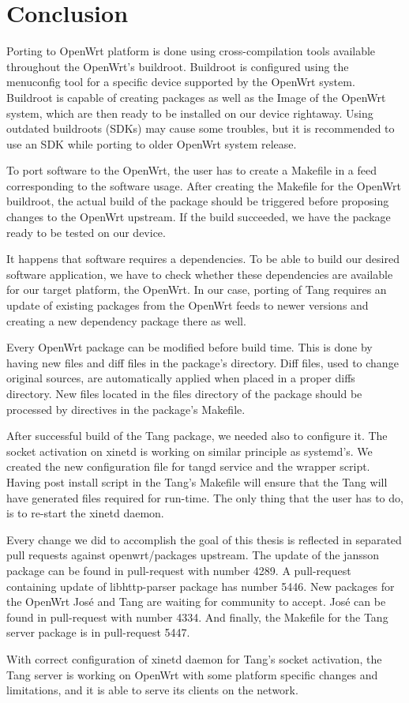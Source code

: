 \chapter{Conclusion}\label{conlusion}


Porting to OpenWrt platform is done using cross-compilation tools available throughout the OpenWrt's buildroot.
Buildroot is configured using the menuconfig tool for a specific device supported by the OpenWrt system.
Buildroot is capable of creating packages as well as the Image of the OpenWrt system, which are then ready to be installed on our device rightaway.
Using outdated buildroots (SDKs) may cause some troubles, but it is recommended to use an SDK while porting to older OpenWrt system release.

To port software to the OpenWrt, the user has to create a Makefile in a feed corresponding to the software usage.
After creating the Makefile for the OpenWrt buildroot, the actual build of the package should be triggered before proposing changes to the OpenWrt upstream.
If the build succeeded, we have the package ready to be tested on our device.

It happens that software requires a dependencies.
To be able to build our desired software application, we have to check whether these dependencies are available for our target platform, the OpenWrt.
In our case, porting of Tang requires an update of existing packages from the OpenWrt feeds to newer versions and creating a new dependency package there as well.

Every OpenWrt package can be modified before build time.
This is done by having new files and diff files in the package's directory.
Diff files, used to change original sources, are automatically applied when placed in a proper diffs directory.
New files located in the files directory of the package should be processed by directives in the package's Makefile.

After successful build of the Tang package, we needed also to configure it.
The socket activation on xinetd is working on similar principle as systemd's.
We created the new configuration file for tangd service and the wrapper script.
Having post install script in the Tang's Makefile will ensure that the Tang will have generated files required for run-time.
The only thing that the user has to do, is to re-start the xinetd daemon.

Every change we did to accomplish the goal of this thesis is reflected in separated pull requests against openwrt/packages upstream.
The update of the jansson package can be found in pull-request with number 4289.
A pull-request containing update of libhttp-parser package has number 5446.
New packages for the OpenWrt José and Tang are waiting for community to accept.
José can be found in pull-request with number 4334.
And finally, the Makefile for the Tang server package is in pull-request 5447.

With correct configuration of xinetd daemon for Tang's socket activation, the Tang server is working on OpenWrt with some platform specific changes and limitations, and it is able to serve its clients on the network.
